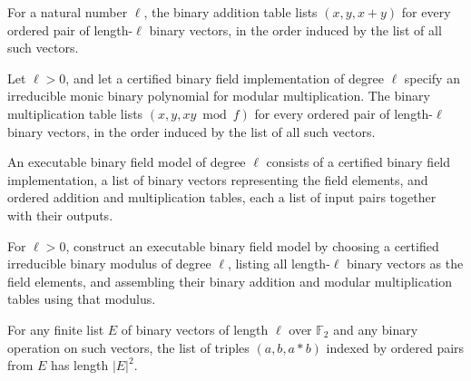 \begin{definition}
\label{FABL.binaryAdditionTable}
\leanok
{}
For a natural number $\ell$, the binary addition table lists $(x,y,x+y)$ for every
ordered pair of length-$\ell$ binary vectors, in the order induced by the list of all
such vectors.
\end{definition}

\begin{definition}
\label{FABL.binaryMultiplicationTable}
\leanok
{}
Let $\ell>0$, and let a certified binary field implementation of degree $\ell$ specify
an irreducible monic binary polynomial for modular multiplication. The binary
multiplication table lists $(x,y,xy\bmod f)$ for every ordered pair of length-$\ell$
binary vectors, in the order induced by the list of all such vectors.
\end{definition}

\begin{definition}
\label{FABL.ExecutableBinaryFieldModel}
\leanok
{}
An executable binary field model of degree $\ell$ consists of a certified binary field
implementation, a list of binary vectors representing the field elements, and ordered
addition and multiplication tables, each a list of input pairs together with their
outputs.
\end{definition}

\begin{definition}
\label{FABL.buildExecutableBinaryFieldModel}
\leanok
{}
For $\ell>0$, construct an executable binary field model by choosing a certified
irreducible binary modulus of degree $\ell$, listing all length-$\ell$ binary vectors as
the field elements, and assembling their binary addition and modular multiplication
tables using that modulus.
\end{definition}

\begin{theorem}
\label{FABL.length_binaryOperationTable}
\leanok
{}
For any finite list $E$ of binary vectors of length $\ell$ over $\mathbb F_2$ and any
binary operation on such vectors, the list of triples $(a,b,a*b)$ indexed by ordered
pairs from $E$ has length $|E|^2$.
\end{theorem}

